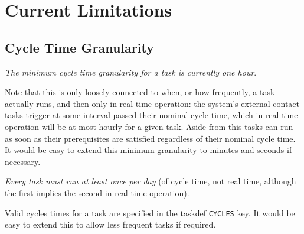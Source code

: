 \documentclass[11pt,a4paper]{article}
\begin{document}
\pagebreak
\section{Current Limitations}

\subsection{Cycle Time Granularity}

{\em The minimum cycle time granularity for a task is currently one hour}.

Note that this is only loosely connected to when, or how frequently, a
task actually runs, and then only in real time operation: the system's
external contact tasks trigger at some interval passed their nominal
cycle time, which in real time operation will be at most hourly for a
given task. Aside from this tasks can run as soon as their prerequisites
are satisfied regardless of their nominal cycle time. It would be easy
to extend this minimum granularity to minutes and seconds if necessary.  

{\em Every task must run at least once per day} (of cycle time, not real
time, although the first implies the second in real time operation). 

Valid cycles times for a task are specified in the taskdef
\lstinline=CYCLES= key.  It would be easy to extend this to allow less
frequent tasks if required. 


%

%
\end{document}
